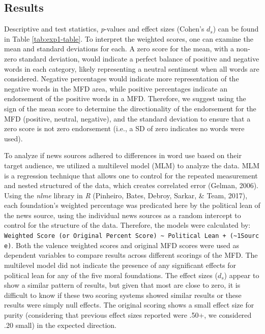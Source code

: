 \documentclass[
  man,floatsintext]{apa6}
\begin{document}
\subsection{Results}\label{results-3}

Descriptive and test statistics, \emph{p}-values and effect sizes (Cohen's
\(d_s\)) can be found in Table \ref{tab:exp1-table}. To interpret the
weighted scores, one can examine the mean and standard deviations for
each. A zero score for the mean, with a non-zero standard deviation,
would indicate a perfect balance of positive and negative words in each
category, likely representing a neutral sentiment when all words are
considered. Negative percentages would indicate more representation of
the negative words in the MFD area, while positive percentages indicate
an endorsement of the positive words in a MFD. Therefore, we suggest
using the sign of the mean score to determine the directionality of the
endorsement for the MFD (positive, neutral, negative), and the standard
deviation to ensure that a zero score is not zero endorsement (i.e., a
SD of zero indicates no words were used).

To analyze if news sources adhered to differences in word use based on
their target audience, we utilized a multilevel model (MLM) to analyze
the data. MLM is a regression technique that allows one to control for
the repeated measurement and nested structured of the data, which
creates correlated error (Gelman, 2006). Using the \emph{nlme} library in \emph{R}
(Pinheiro, Bates, Debroy, Sarkar, \& Team, 2017), each foundation's weighted percentage was predicated
here by the political lean of the news source, using the individual news
sources as a random intercept to control for the structure of the data.
Therefore, the models were calculated by: \texttt{Weighted\ Score\ (or\ Original\ Percent\ Score)\ \textasciitilde{}\ Political\ Lean\ +\ (\textasciitilde{}1\textbar{}Source)}. Both the valence weighted scores and original MFD scores were used as dependent variables to compare results across different scorings of the MFD. The multilevel model did not indicate the presence of any significant effects for political lean for any of the five moral
foundations. The effect sizes (\(d_s\)) appear to show a similar pattern of results, but given that most are close to zero, it is difficult to know if these two scoring systems showed similar results or these results were simply null effects. The original scoring shows a small effect size for purity (considering that previous effect sizes reported were .50+, we considered .20 small) in the expected direction.
\end{document}
